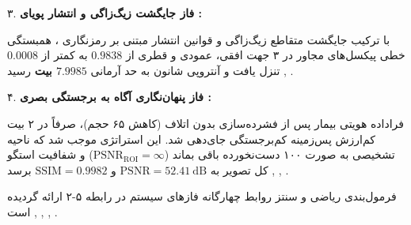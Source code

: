 

۳. \textbf{فاز جایگشت زیگ‌زاگی و انتشار پویای  :}\par

با ترکیب جایگشت متقاطع زیگ‌زاگی  و قوانین انتشار مبتنی بر رمزنگاری  ، همبستگی خطی پیکسل‌های مجاور در ۳ جهت افقی، عمودی و قطری از $0.9838$ به کمتر از \textbf{$0.0008$} تنزل یافت و آنتروپی شانون به حد آرمانی \textbf{$7.9985$ بیت} رسید , .\par



۴. \textbf{فاز پنهان‌نگاری آگاه به برجستگی بصری :}\par

فراداده هویتی بیمار پس از فشرده‌سازی بدون اتلاف  (کاهش ۶۵ حجم)، صرفاً در ۲ بیت کم‌ارزش  پس‌زمینه کم‌برجستگی جای‌دهی شد. این استراتژی موجب شد که ناحیه تشخیصی  به صورت ۱۰۰ دست‌نخورده باقی بماند ($\mathrm{PSNR}_{\mathrm{ROI}} = \infty$) و شفافیت استگو کل تصویر به \textbf{$\mathrm{PSNR} = 52.41\mathrm{\ dB}$} و \textbf{$\mathrm{SSIM} = 0.9982$} برسد , , .\par



فرمول‌بندی ریاضی و سنتز روابط چهارگانه فازهای سیستم در رابطه ۵{-}۲ ارائه گردیده است , , , .\par





